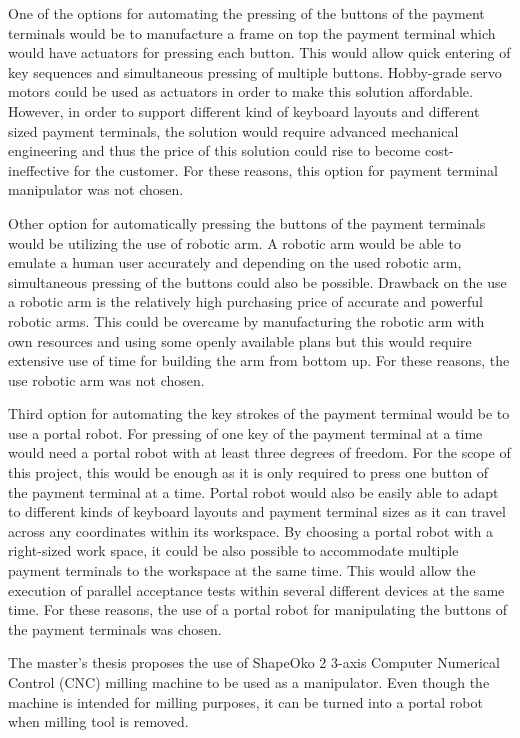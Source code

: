 One of the options for automating the pressing of the buttons of the payment terminals would be to manufacture a frame on top the payment terminal which would have actuators for pressing each button. This would allow quick entering of key sequences and simultaneous pressing of multiple buttons. Hobby-grade servo motors could be used as actuators in order to make this solution affordable. However, in order to support different kind of keyboard layouts and different sized payment terminals, the solution would require advanced mechanical engineering and thus the price of this solution could rise to become cost-ineffective for the customer. For these reasons, this option for payment terminal manipulator was not chosen.

Other option for automatically pressing the buttons of the payment terminals would be utilizing the use of robotic arm. A robotic arm would be able to emulate a human user accurately and depending on the used robotic arm, simultaneous pressing of the buttons could also be possible. Drawback on the use a robotic arm is the relatively high purchasing price of accurate and powerful robotic arms. This could be overcame by manufacturing the robotic arm with own resources and using some openly available plans \citep{bcn3d} but this would require extensive use of time for building the arm from bottom up. For these reasons, the use robotic arm was not chosen.

Third option for automating the key strokes of the payment terminal would be to use a portal robot. For pressing of one key of the payment terminal at a time would need a portal robot with at least three degrees of freedom. For the scope of this project, this would be enough as it is only required to press one button of the payment terminal at a time. Portal robot would also be easily able to adapt to different kinds of keyboard layouts and payment terminal sizes as it can travel across any coordinates within its workspace. By choosing a portal robot with a right-sized work space, it could be also possible to accommodate multiple payment terminals to the workspace at the same time. This would allow the execution of parallel acceptance tests within several different devices at the same time. For these reasons, the use of a portal robot for manipulating the buttons of the payment terminals was chosen.

The master's thesis proposes the use of ShapeOko 2 3-axis Computer Numerical Control (CNC) milling machine \citep{shapeoko} to be used as a manipulator. Even though the machine is intended for milling purposes, it can be turned into a portal robot when milling tool is removed.

